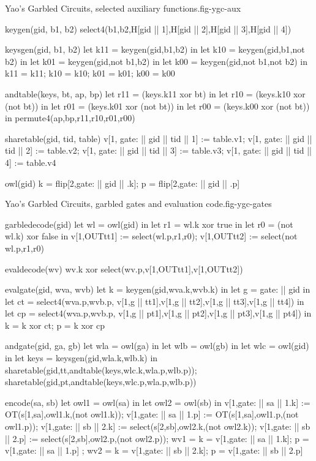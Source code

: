 \begin{fpfig}[t]{Yao's Garbled Circuits, selected auxiliary functions.}{fig-ygc-aux}
{\footnotesize
\begin{verbatimtab}
  keygen(gid, b1, b2) { select4(b1,b2,H[gid || 1],H[gid || 2],H[gid || 3],H[gid || 4]) }
  
  keysgen(gid, b1, b2)
  {
    let k11 = keygen(gid,b1,b2) in
    let k10 = keygen(gid,b1,not b2) in
    let k01 = keygen(gid,not b1,b2) in
    let k00 = keygen(gid,not b1,not b2) in
    {k11 = k11; k10 = k10; k01 = k01; k00 = k00}
  }
  
  andtable(keys, bt, ap, bp)
  {
    let r11 = (keys.k11 xor bt) in 
    let r10 = (keys.k10 xor (not bt)) in
    let r01 = (keys.k01 xor (not bt)) in
    let r00 = (keys.k00 xor (not bt)) in
    permute4(ap,bp,r11,r10,r01,r00)
  }
  
  sharetable(gid, tid, table)
  {   
    v[1, gate: || gid || tid || 1] := table.v1;
    v[1, gate: || gid || tid || 2] := table.v2;
    v[1, gate: || gid || tid || 3] := table.v3;
    v[1, gate: || gid || tid || 4] := table.v4
  }

  owl(gid) {  { k = flip[2,gate: || gid || .k]; p = flip[2,gate: || gid || .p] }  }
\end{verbatimtab}
}
\end{fpfig}

\begin{fpfig}[t]{Yao's Garbled Circuits, garbled gates and evaluation code.}{fig-ygc-gates}
{\footnotesize
\begin{verbatimtab}
  garbledecode(gid)    
  {
    let wl = owl(gid) in
    let r1 = wl.k xor true in
    let r0 = (not wl.k) xor false in
    v[1,OUTtt1] := select(wl.p,r1,r0);
    v[1,OUTtt2] := select(not wl.p,r1,r0)
  }
  
  evaldecode(wv) { wv.k xor select(wv.p,v[1,OUTtt1],v[1,OUTtt2]) }
  
  evalgate(gid, wva, wvb)  
  {
    let k = keygen(gid,wva.k,wvb.k) in
    let g = gate: || gid in
    let ct = select4(wva.p,wvb.p,
               v[1,g || tt1],v[1,g || tt2],v[1,g || tt3],v[1,g || tt4]) in
    let cp = select4(wva.p,wvb.p,
               v[1,g || pt1],v[1,g || pt2],v[1,g || pt3],v[1,g || pt4]) in
    { k = k xor ct; p = k xor cp }
  }
  
  andgate(gid, ga, gb) 
  {
    let wla = owl(ga) in
    let wlb = owl(gb) in
    let wlc = owl(gid) in
    let keys = keysgen(gid,wla.k,wlb.k) in
    sharetable(gid,tt,andtable(keys,wlc.k,wla.p,wlb.p));
    sharetable(gid,pt,andtable(keys,wlc.p,wla.p,wlb.p))
  }

  encode(sa, sb)
  {
    let owl1 = owl(sa) in
    let owl2 = owl(sb) in
    v[1,gate: || sa || 1.k] := OT(s[1,sa],owl1.k,(not owl1.k));
    v[1,gate: || sa || 1.p] := OT(s[1,sa],owl1.p,(not owl1.p));
    v[1,gate: || sb || 2.k] := select(s[2,sb],owl2.k,(not owl2.k));
    v[1,gate: || sb || 2.p] := select(s[2,sb],owl2.p,(not owl2.p));
    { wv1 = { k = v[1,gate: || sa || 1.k]; p = v[1,gate: || sa || 1.p] };
      wv2 = { k = v[1,gate: || sb || 2.k]; p = v[1,gate: || sb || 2.p] } }
  }
\end{verbatimtab}
}
\end{fpfig}

